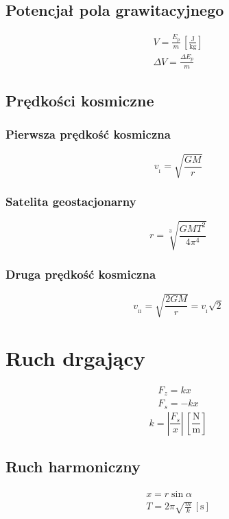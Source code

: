 \documentclass{article}
\numberwithin{equation}{section}
\newcommand{\unit}[1]{\, \left[\mathrm{#1}\right]}
\begin{document}
    \subsection{Potencjał pola grawitacyjnego}
      \begin{gather}
        V = \frac{E_p}{m} \unit{\frac{J}{kg}}\\
        \Delta V = \frac{\Delta E_p}{m}
      \end{gather}
    \subsection{Prędkości kosmiczne}
      \subsubsection{Pierwsza prędkość kosmiczna}
        \begin{equation}
          v_{{}_\mathrm{I}} = \sqrt{\frac{GM}{r}}
        \end{equation}
      \subsubsection{Satelita geostacjonarny}
        \begin{equation}
          r = \sqrt[3]{\frac{GMT^2}{4\pi^4}}
        \end{equation}
      \subsubsection{Druga prędkość kosmiczna}
        \begin{equation}
          v_{{}_\mathrm{II}} = \sqrt{\frac{2GM}{r}} = v_{{}_\mathrm{I}}\sqrt{2}
        \end{equation}

  \newpage
  \section{Ruch drgający}
    \begin{gather}
      F_z = kx\\
      F_s = -kx
    \end{gather}
    \begin{equation}
      k = \left|\frac{F_s}{x}\right| \unit{\frac Nm}
    \end{equation}
    \subsection{Ruch harmoniczny}
      \begin{gather}
        x = r\sin\alpha\\
        T = 2\pi\sqrt{\frac mk} \unit{s}
      \end{gather}
\end{document}

